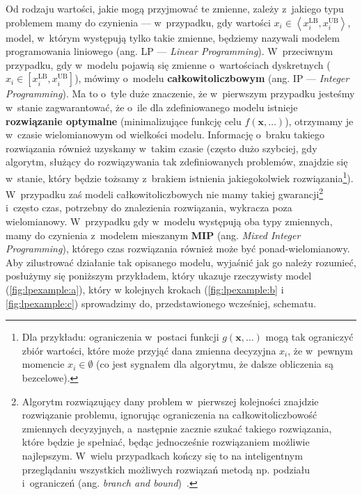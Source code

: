 Od rodzaju wartości, jakie mogą przyjmować te zmienne, zależy z~jakiego typu problemem mamy do czynienia --- w~przypadku, gdy wartości $x_{i} \in \left\langle x_{i}^{\textrm{LB}}, x_{i}^{\textrm{UB}} \right\rangle$, model, w~którym występują tylko takie zmienne, będziemy nazywali modelem programowania liniowego (ang. \textsc{LP} --- \textit{Linear Programming}).
W~przeciwnym przypadku, gdy w~modelu pojawią się zmienne o~wartościach dyskretnych ($x_{i} \in \left[ x_{i}^{\textrm{LB}}, x_{i}^{\textrm{UB}} \right]$), mówimy o~modelu \textbf{całkowitoliczbowym} (ang. \textsc{IP} --- \textit{Integer Programming}).
Ma to o~tyle duże znaczenie, że w~pierwszym przypadku jesteśmy w~stanie zagwarantować, że o~ile dla zdefiniowanego modelu istnieje \textbf{rozwiązanie optymalne} (minimalizujące funkcję celu $f \left( \textbf{x}, \dots \right)$), otrzymamy je w~czasie wielomianowym od wielkości modelu.
Informację o~braku takiego rozwiązania również uzyskamy w~takim czasie (często dużo szybciej, gdy algorytm, służący do rozwiązywania tak zdefiniowanych problemów, znajdzie się w~stanie, który będzie tożsamy z~brakiem istnienia jakiegokolwiek rozwiązania\footnote{
	Dla przykładu: ograniczenia w~postaci funkcji $g \left( \textbf{x}, \dots \right)$ mogą tak ograniczyć zbiór wartości, które może przyjąć dana zmienna decyzyjna $x_{i}$, że w~pewnym momencie $x_{i} \in \emptyset$ (co jest sygnałem dla algorytmu, że dalsze obliczenia są bezcelowe).
}).
W~przypadku zaś modeli całkowitoliczbowych nie mamy takiej gwarancji\footnote{
	Algorytm rozwiązujący dany problem w~pierwszej kolejności znajdzie rozwiązanie problemu, ignorując ograniczenia na całkowitoliczbowość zmiennych decyzyjnych, a~następnie zacznie szukać takiego rozwiązania, które będzie je spełniać, będąc jednocześnie rozwiązaniem możliwie najlepszym.
	W~wielu przypadkach kończy się to na inteligentnym przeglądaniu wszystkich możliwych rozwiązań metodą np. podziału i~ograniczeń (ang. \textit{branch and bound})~\cite[$433$--$448$]{Papadimitriou:1982:COA:31027}.
} i~często czas, potrzebny do znalezienia rozwiązania, wykracza poza wielomianowy.
W~przypadku gdy w~modelu występują oba typy zmiennych, mamy do czynienia z~modelem mieszanym \textbf{MIP} (ang. \textit{Mixed Integer Programming}), którego czas rozwiązania również może być ponad-wielomianowy.
Aby zilustrować działanie tak opisanego modelu, wyjaśnić jak go należy rozumieć, posłużymy się poniższym przykładem, który ukazuje rzeczywisty model (\ref{fig:lpexample:a}), który w kolejnych krokach (\ref{fig:lpexample:b} i \ref{fig:lpexample:c}) sprowadzimy do, przedstawionego wcześniej, schematu.


